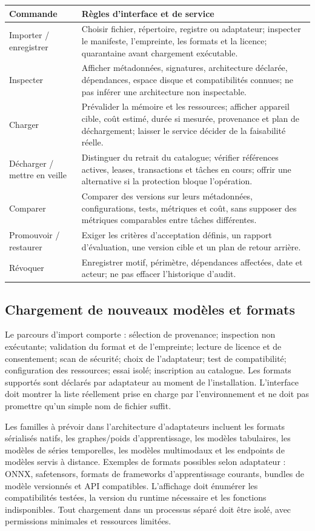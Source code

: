 \documentclass[11pt,a4paper]{article}
\begin{document}
\begin{longtable}{p{}p{}}
\toprule
\textbf{Commande} & \textbf{Règles d'interface et de service}\\
\midrule
Importer / enregistrer & Choisir fichier, répertoire, registre ou adaptateur; inspecter le manifeste, l'empreinte, les formats et la licence; quarantaine avant chargement exécutable.\\
Inspecter & Afficher métadonnées, signatures, architecture déclarée, dépendances, espace disque et compatibilités connues; ne pas inférer une architecture non inspectable.\\
Charger & Prévalider la mémoire et les ressources; afficher appareil cible, coût estimé, durée si mesurée, provenance et plan de déchargement; laisser le service décider de la faisabilité réelle.\\
Décharger / mettre en veille & Distinguer du retrait du catalogue; vérifier références actives, leases, transactions et tâches en cours; offrir une alternative si la protection bloque l'opération.\\
Comparer & Comparer des versions sur leurs métadonnées, configurations, tests, métriques et coût, sans supposer des métriques comparables entre tâches différentes.\\
Promouvoir / restaurer & Exiger les critères d'acceptation définis, un rapport d'évaluation, une version cible et un plan de retour arrière.\\
Révoquer & Enregistrer motif, périmètre, dépendances affectées, date et acteur; ne pas effacer l'historique d'audit.\\
\bottomrule
\end{longtable}

\subsection{Chargement de nouveaux modèles et formats}
Le parcours d'import comporte : sélection de provenance; inspection non exécutante; validation du format et de l'empreinte; lecture de licence et de consentement; scan de sécurité; choix de l'adaptateur; test de compatibilité; configuration des ressources; essai isolé; inscription au catalogue. Les formats supportés sont déclarés par adaptateur au moment de l'installation. L'interface doit montrer la liste réellement prise en charge par l'environnement et ne doit pas promettre qu'un simple nom de fichier suffit.

Les familles à prévoir dans l'architecture d'adaptateurs incluent les formats sérialisés natifs, les graphes/poids d'apprentissage, les modèles tabulaires, les modèles de séries temporelles, les modèles multimodaux et les endpoints de modèles servis à distance. Exemples de formats possibles selon adaptateur : ONNX, safetensors, formats de frameworks d'apprentissage courants, bundles de modèle versionnés et API compatibles. L'affichage doit énumérer les compatibilités testées, la version du runtime nécessaire et les fonctions indisponibles. Tout chargement dans un processus séparé doit être isolé, avec permissions minimales et ressources limitées.
\end{document}
